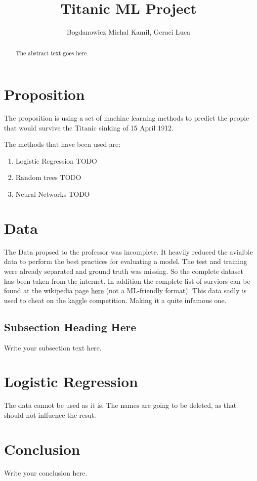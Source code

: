 \documentclass{article}
\begin{document}
\title{Titanic ML Project}
\author{Bogdanowicz Michal Kamil, Geraci Luca}

\maketitle

\begin{abstract}
The abstract text goes here.
\end{abstract}


\section{Proposition}
The proposition is using a set of machine learning methods to predict the people that would survive the Titanic sinking of 15 April 1912.

The methods that have been used are:

\begin{enumerate}  
\item Logistic Regression TODO
\item Random trees TODO
\item Neural Networks TODO
\end{enumerate}

\section{Data}

The Data propsed to the professor was incomplete. It heavily reduced the avialble data to perform the best practices for evaluating a model. The test and training were already separated and ground truth was missing. So the complete dataset has been taken from the internet. In addition the complete list of surviors can be found at the wikipedia page \href{https://en.wikipedia.org/wiki/Passengers_of_the_RMS_Titanic}{here} (not a ML-friendly format).
This data sadly is used to cheat on the kaggle competition. Making it a quite infamous one.


\subsection{Subsection Heading Here}
Write your subsection text here.

\section{Logistic Regression}
The data cannot be used as it is.
The names are going to be deleted, as that should not inlfuence the resut.


\section{Conclusion}
Write your conclusion here.
\end{document}
